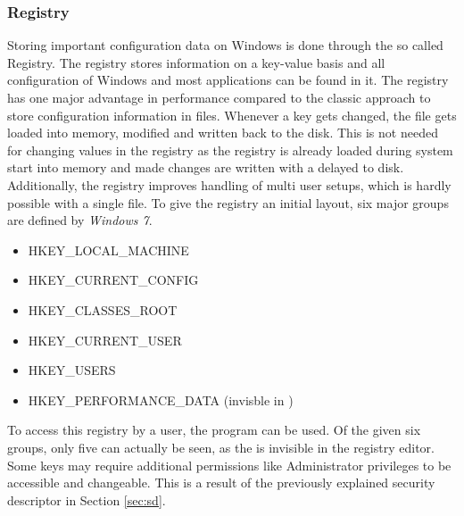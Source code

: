 \subsubsection{Registry}
Storing important configuration data on Windows is done through the so called Registry. The registry stores information on a key-value basis and all configuration of Windows and most applications can be found in it. The registry has one major advantage in performance compared to the classic approach to store configuration information in  files. Whenever a key gets changed, the  file gets loaded into memory, modified and written back to the disk. This is not needed for changing values in the registry as the registry is already loaded during system start into memory and made changes are written with a delayed to disk. Additionally, the registry improves handling of multi user setups, which is hardly possible with a single  file. To give the registry an initial layout, six major groups are defined by \emph{Windows 7}.
\begin{itemize}
\label{sec:registrykeys}
\item HKEY\_LOCAL\_MACHINE
\item HKEY\_CURRENT\_CONFIG 
\item HKEY\_CLASSES\_ROOT 
\item HKEY\_CURRENT\_USER 
\item HKEY\_USERS
\item HKEY\_PERFORMANCE\_DATA (invisble in )
\end{itemize}
To access this registry by a user, the  \cite{msdn_regedit} program can be used. Of the given six groups, only five can actually be seen, as the  is invisible in the registry editor. Some keys may require additional permissions like Administrator privileges to be accessible and changeable. This is a result of the previously explained security descriptor in Section \ref{sec:sd}.